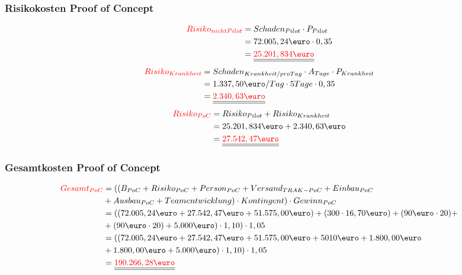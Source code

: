 \documentclass[a4paper,10pt]{scrartcl}
\begin{document}
\subsubsection{Risikokosten Proof of Concept}
\begin{equation}
\begin{split}
\textcolor{red}{Risiko_{nichtPilot}} &= Schaden_{Pilot} \cdot P_{Pilot} \\\
&= 72.005,24 \text{\euro} \cdot 0,35 \\\
&= \underline{\underline{\textcolor{red}{25.201,834\text{\euro}}}}
\end{split}
\end{equation}
\begin{equation}
\begin{split}
\textcolor{red}{Risiko_{Krankheit}} &= Schaden_{Krankheit/pro Tag} \cdot A_{Tage} \cdot P_{Krankheit} \\\
&= 1.337,50\text{\euro}/Tag \cdot 5 Tage \cdot 0,35\\\
&= \underline{\underline{\textcolor{red}{2.340,63\text{\euro}}}}
\end{split}
\end{equation}
\begin{equation}
\begin{split}
\textcolor{red}{Risiko_{PoC}} &= Risiko_{Pilot} + Risiko_{Krankheit} \\\
&= 25.201,834\text{\euro} + 2.340,63\text{\euro} \\\
&= \underline{\underline{\textcolor{red}{27.542,47\text{\euro}}}}
\end{split}
\end{equation}

\subsubsection{Gesamtkosten Proof of Concept}%
\begin{equation}
\begin{split}
\textcolor{red}{Gesamt_{PoC}} &= ((B_{PoC} + Risiko_{PoC} + Person_{PoC} + Versand_{TRAK-PoC} + Einbau_{PoC}  \\\ 
&+ Ausbau_{PoC} + Teamentwicklung) \cdot Kontingent) \cdot Gewinn_{PoC}\\\
&= ((72.005,24\text{\euro} + 27.542,47\text{\euro} + 51.575,00\text{\euro}) + (300 \cdot 16,70\text{\euro}) + (90\text{\euro} \cdot 20 ) + \\\
&+ (90\text{\euro} \cdot 20) + 5.000 \text{\euro} ) \cdot 1,10)\cdot 1,05\\\
&= ((72.005,24\text{\euro} + 27.542,47\text{\euro} + 51.575,00\text{\euro} + 5010\text{\euro} 
+ 1.800,00\text{\euro}\\\  
&+ 1.800,00\text{\euro} + 5.000 \text{\euro} ) \cdot 1,10)\cdot 1,05\\\
&= \underline{\underline{\textcolor{red}{190.266,28\text{\euro}}}}
\end{split}
\end{equation}
\end{document}
